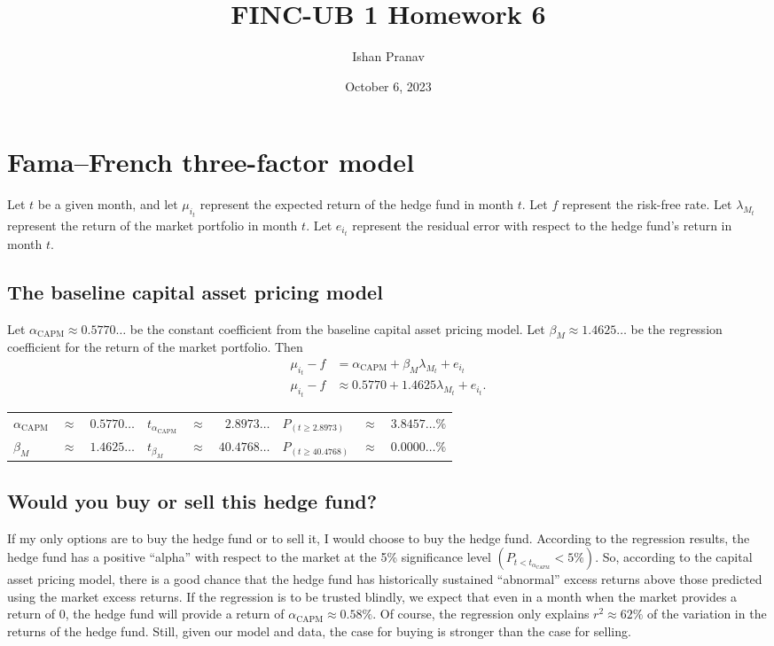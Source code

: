 \documentclass[12pt]{article}
\title{FINC-UB 1 Homework 6}
\author{Ishan Pranav}
\date{October 6, 2023}
\begin{document}
\maketitle
\section*{Fama--French three-factor model}
Let $t$ be a given month, and let $\mu_{i_t}$ represent the expected return of the hedge fund in month $t$. Let $f$ represent the risk-free rate. Let $\lambda_{M_t}$ represent the return of the market portfolio in month $t$. Let $e_{i_t}$ represent the residual error with respect to the hedge fund's return in month $t$. 
\subsection{The baseline capital asset pricing model}
Let $\alpha_{\mathrm{CAPM}}\approx 0.5770\dots$ be the constant coefficient from the baseline capital asset pricing model. Let $\beta_M\approx 1.4625\dots$ be the regression coefficient for the return of the market portfolio. Then
\begin{align*}
\mu_{i_t}-f&=\alpha_{\mathrm{CAPM}}+\beta_M\lambda_{M_t}+e_{i_t}\\
\mu_{i_t}-f&\approx 0.5770+1.4625\lambda_{M_t}+e_{i_t}.
\end{align*}
\begin{center}
\begin{tabular}{lcr|lcr|lcr}
$\alpha_{\mathrm{CAPM}}$&$\approx$&$0.5770\dots$&$t_{\alpha_{\mathrm{CAPM}}}$&$\approx$&$2.8973\dots$&$P_{(t\geq 2.8973)}$&$\approx$&$3.8457\dots\%$\\
$\beta_M$&$\approx$&$1.4625\dots$&$t_{\beta_M}$&$\approx$&$40.4768\dots$&$P_{(t\geq 40.4768)}$&$\approx$&$0.0000\dots\%$
\end{tabular}
\end{center}
\subsection{Would you buy or sell this hedge fund?}
If my only options are to buy the hedge fund or to sell it, I would choose to buy the hedge fund. According to the regression results, the hedge fund has a positive ``alpha'' with respect to the market at the 5\% significance level $\left(P_{t<t_{\alpha_{\mathrm{CAPM}}}}<5\%\right)$. So, according to the capital asset pricing model, there is a good chance that the hedge fund has historically sustained ``abnormal'' excess returns above those predicted using the market excess returns. If the regression is to be trusted blindly, we expect that even in a month when the market provides a return of 0, the hedge fund will provide a return of $\alpha_{\mathrm{CAPM}}\approx 0.58\%$. Of course, the regression only explains $r^2\approx 62\%$ of the variation in the returns of the hedge fund. Still, given our model and data, the case for buying is stronger than the case for selling.
\end{document}
